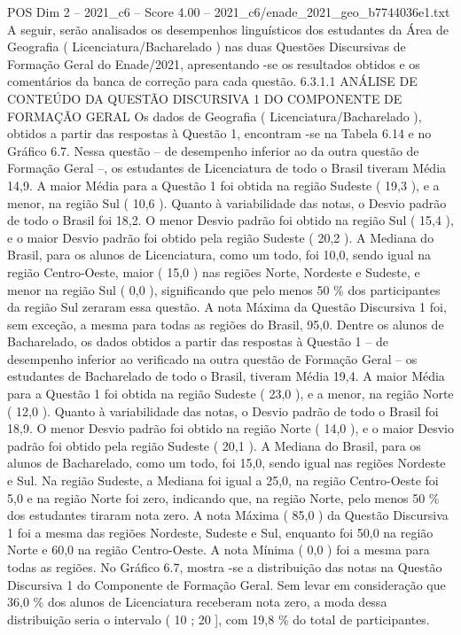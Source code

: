 \begin{textsample}{POS Dim 2 – 2021\_c6 – Score 4.00 – 2021\_c6/enade\_2021\_geo\_b7744036e1.txt}
A seguir, serão analisados os desempenhos linguísticos dos estudantes da Área de Geografia ( Licenciatura/Bacharelado ) nas duas Questões Discursivas de Formação Geral do Enade/2021, apresentando -se os resultados obtidos e os comentários da banca de correção para cada questão. 6.3.1.1 ANÁLISE DE CONTEÚDO DA QUESTÃO DISCURSIVA 1 DO COMPONENTE DE FORMAÇÃO GERAL Os dados de Geografia ( Licenciatura/Bacharelado ), obtidos a partir das respostas à Questão 1, encontram -se na Tabela 6.14 e no Gráfico 6.7.
Nessa questão – de desempenho inferior ao da outra questão de Formação Geral –, os estudantes de Licenciatura de todo o Brasil tiveram Média 14,9.
A maior Média para a Questão 1 foi obtida na região Sudeste ( 19,3 ), e a menor, na região Sul ( 10,6 ).
Quanto à variabilidade das notas, o Desvio padrão de todo o Brasil foi 18,2.
O menor Desvio padrão foi obtido na região Sul ( 15,4 ), e o maior Desvio padrão foi obtido pela região Sudeste ( 20,2 ).
A Mediana do Brasil, para os alunos de Licenciatura, como um todo, foi 10,0, sendo igual na região Centro-Oeste, maior ( 15,0 ) nas regiões Norte, Nordeste e Sudeste, e menor na região Sul ( 0,0 ), significando que pelo menos 50 \% dos participantes da região Sul zeraram essa questão.
A nota Máxima da Questão Discursiva 1 foi, sem exceção, a mesma para todas as regiões do Brasil, 95,0.
Dentre os alunos de Bacharelado, os dados obtidos a partir das respostas à Questão 1 – de desempenho inferior ao verificado na outra questão de Formação Geral – os estudantes de Bacharelado de todo o Brasil, tiveram Média 19,4.
A maior Média para a Questão 1 foi obtida na região Sudeste ( 23,0 ), e a menor, na região Norte ( 12,0 ).
Quanto à variabilidade das notas, o Desvio padrão de todo o Brasil foi 18,9.
O menor Desvio padrão foi obtido na região Norte ( 14,0 ), e o maior Desvio padrão foi obtido pela região Sudeste ( 20,1 ).
A Mediana do Brasil, para os alunos de Bacharelado, como um todo, foi 15,0, sendo igual nas regiões Nordeste e Sul.
Na região Sudeste, a Mediana foi igual a 25,0, na região Centro-Oeste foi 5,0 e na região Norte foi zero, indicando que, na região Norte, pelo menos 50 \% dos estudantes tiraram nota zero.
A nota Máxima ( 85,0 ) da Questão Discursiva 1 foi a mesma das regiões Nordeste, Sudeste e Sul, enquanto foi 50,0 na região Norte e 60,0 na região Centro-Oeste.
A nota Mínima ( 0,0 ) foi a mesma para todas as regiões.
No Gráfico 6.7, mostra -se a distribuição das notas na Questão Discursiva 1 do Componente de Formação Geral.
Sem levar em consideração que 36,0 \% dos alunos de Licenciatura receberam nota zero, a moda dessa distribuição seria o intervalo ( 10 ; 20 ], com 19,8 \% do total de participantes.

\end{textsample}
